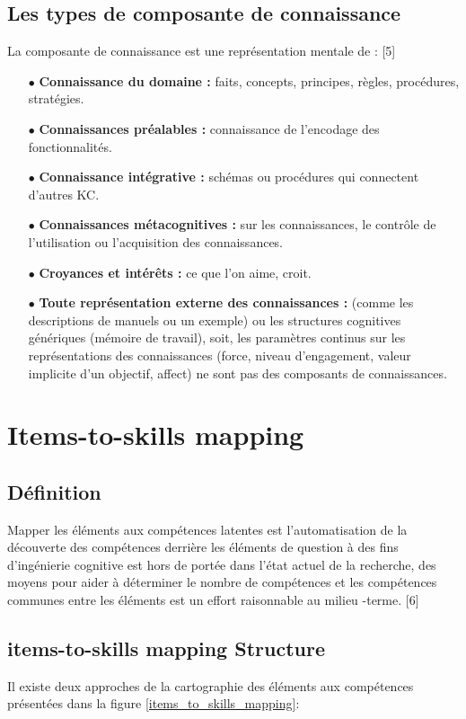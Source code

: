\subsection{Les types de composante de connaissance}

La composante de connaissance est une représentation mentale de : [5]

\begin{itemize}
    \item[$\bullet$] \textbf{Connaissance du domaine :} faits, concepts, principes, règles, procédures, stratégies.
    \item[$\bullet$] \textbf{Connaissances préalables :} connaissance de l'encodage des fonctionnalités.
    \item[$\bullet$] \textbf{Connaissance intégrative :} schémas ou procédures qui connectent d'autres KC.
    \item[$\bullet$] \textbf{Connaissances métacognitives :} sur les connaissances, le contrôle de l'utilisation ou l'acquisition des connaissances.
    \item[$\bullet$] \textbf{Croyances et intérêts :} ce que l'on aime, croit.
    \item[$\bullet$] \textbf{Toute représentation externe des connaissances :} (comme les descriptions de manuels ou un exemple) ou les structures cognitives génériques (mémoire de travail), soit, les paramètres continus sur les représentations des connaissances (force, niveau d'engagement, valeur implicite d'un objectif, affect) ne sont pas des composants de connaissances.
\end{itemize}

\section{Items-to-skills mapping}
\subsection{Définition}
Mapper les éléments aux compétences latentes est l'automatisation de la découverte des compétences derrière les éléments de question à des fins d'ingénierie cognitive est hors de portée dans l'état actuel de la recherche, des moyens pour aider à déterminer le nombre de compétences et les compétences communes entre les éléments est un effort raisonnable au milieu -terme. [6]

\subsection{items-to-skills mapping Structure}
Il existe deux approches de la cartographie des éléments aux compétences présentées dans la figure \ref{items_to_skills_mapping}:


